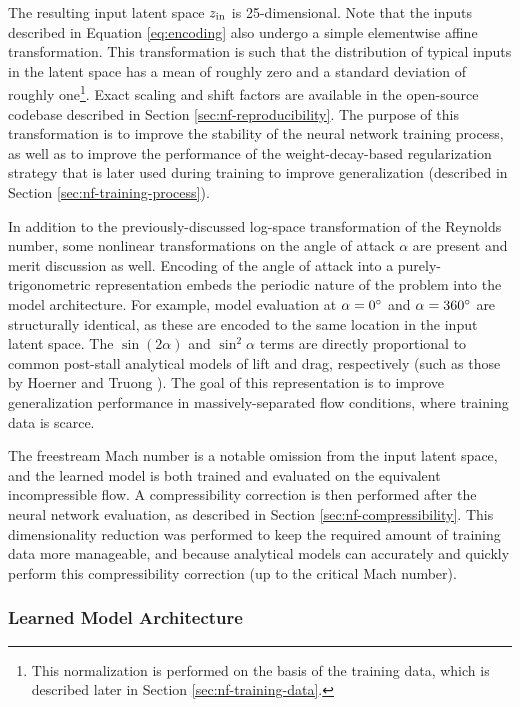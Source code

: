 The resulting input latent space $z_{\rm in}$ is 25-dimensional. Note that the inputs described in Equation \ref{eq:encoding} also undergo a simple elementwise affine transformation. This transformation is such that the distribution of typical inputs in the latent space has a mean of roughly zero and a standard deviation of roughly one\footnote{This normalization is performed on the basis of the training data, which is described later in Section \ref{sec:nf-training-data}.}. Exact scaling and shift factors are available in the open-source codebase described in Section \ref{sec:nf-reproducibility}. The purpose of this transformation is to improve the stability of the neural network training process, as well as to improve the performance of the weight-decay-based regularization strategy that is later used during training to improve generalization (described in Section \ref{sec:nf-training-process}).

In addition to the previously-discussed log-space transformation of the Reynolds number, some nonlinear transformations on the angle of attack $\alpha$ are present and merit discussion as well. Encoding of the angle of attack into a purely-trigonometric representation embeds the periodic nature of the problem into the model architecture. For example, model evaluation at $\alpha=0\degree$ and $\alpha=360\degree$ are structurally identical, as these are encoded to the same location in the input latent space. The $\sin(2\alpha)$ and $\sin^2\alpha$ terms are directly proportional to common post-stall analytical models of lift and drag, respectively (such as those by Hoerner and Truong \cite{hoerner_fluiddynamic_1992, truong_analytical_2020}). The goal of this representation is to improve generalization performance in massively-separated flow conditions, where training data is scarce.

The freestream Mach number is a notable omission from the input latent space, and the learned model is both trained and evaluated on the equivalent incompressible flow. A compressibility correction is then performed after the neural network evaluation, as described in Section \ref{sec:nf-compressibility}. This dimensionality reduction was performed to keep the required amount of training data more manageable, and because analytical models can accurately and quickly perform this compressibility correction (up to the critical Mach number).

\subsubsection{Learned Model Architecture}
\label{sec:nf-learned-model-architecture}

